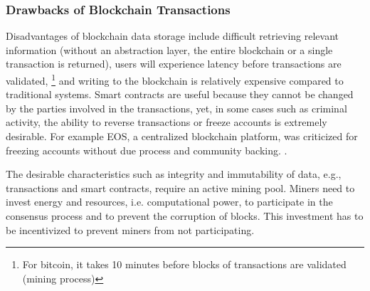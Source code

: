 \subsubsection{Drawbacks of Blockchain Transactions}

	
Disadvantages of blockchain data storage include difficult retrieving relevant information (without an abstraction layer, the entire blockchain or a single transaction is returned), users will experience latency before transactions are validated, 	\footnote{For bitcoin, it takes 10 minutes before blocks of transactions are validated (mining process)} and writing to the blockchain is relatively expensive compared to traditional systems. Smart contracts are useful because they cannot be changed by the parties involved in the transactions, yet, in some cases such as criminal activity, the ability to reverse transactions or freeze accounts is extremely desirable. For example EOS, a centralized blockchain platform, was criticized for freezing accounts without due process and community backing. \cite{EOS:Online}.

The desirable characteristics such as integrity and immutability of data, e.g., transactions and
smart contracts, require an active mining pool. Miners need to invest energy and resources,
i.e. computational power, to participate in the consensus process and to prevent the corruption
of blocks. This investment has to be incentivized to prevent miners from not participating.

\newpage
%
%